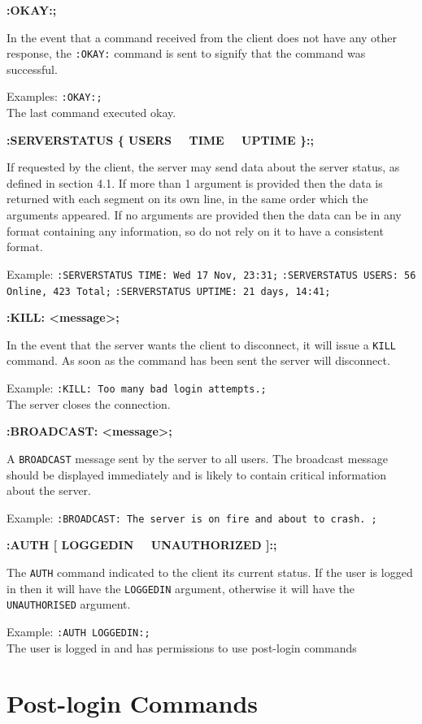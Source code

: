 {\bf :OKAY:;}

In the event that a command received from the client does not have any other response, the \texttt{:OKAY:} command is sent to signify that the command was successful. 

Examples:
\texttt{:OKAY:;}\\
The last command executed okay.

{\bf :SERVERSTATUS \{ USERS \ \vline \ TIME \ \vline \ UPTIME \}:;}

If requested by the client, the server may send data about the server status, as defined in section 4.1. If more than 1 argument is provided then the data is returned with each segment on its own line, in the same order which the arguments appeared. If no arguments are provided then the data can be in any format containing any information, so do not rely on it to have a consistent format.

Example:
\texttt{:SERVERSTATUS TIME: Wed 17 Nov, 23:31;}
\texttt{:SERVERSTATUS USERS: 56 Online, 423 Total;}
\texttt{:SERVERSTATUS UPTIME: 21 days, 14:41;}

{\bf :KILL: <message>;}

In the event that the server wants the client to disconnect, it will issue a \texttt{KILL} command. As soon as the command has been sent the server will disconnect. 

Example:
\texttt{:KILL: Too many bad login attempts.;}\\
The server closes the connection.

{\bf :BROADCAST: <message>;}

A \texttt{BROADCAST} message sent by the server to all users. The broadcast message should be displayed immediately and is likely to contain critical information about the server.

Example:
\texttt{:BROADCAST: The server is on fire and about to crash. ;}

{\bf :AUTH [ LOGGEDIN \ \vline \ UNAUTHORIZED ]:;}

The \texttt{AUTH} command indicated to the client its current status. If the user is logged in then it will have the \texttt{LOGGEDIN} argument, otherwise it will have the \texttt{UNAUTHORISED} argument.

Example:
\texttt{:AUTH LOGGEDIN:;}\\
The user is logged in and has permissions to use post-login commands

\section{Post-login Commands}

